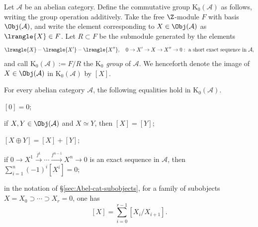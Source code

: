 \begin{definition}\label{def:K0}
Let $\mathcal{A}$ be an abelian category. Define the commutative group
$\mathrm{K}_0(\mathcal{A})$ as follows, writing the group operation
additively. Take the free $\Z$-module $F$ with basis $\Obj(\mathcal{A})$, and
write the element corresponding to $X\in\Obj(\mathcal{A})$ as
$\lrangle{X}\in F$. Let $R\subset F$ be the submodule generated by the
elements
\[\lrangle{X}-\lrangle{X'}-\lrangle{X''},\quad
0\to X'\to X\to X''\to0:\ \text{a short exact sequence in }\mathcal{A},\]
and call $\mathrm{K}_0(\mathcal{A}):=F/R$ the \emph{$\mathrm{K}_0$ group} of
$\mathcal{A}$. We henceforth denote the image of
$X\in\Obj(\mathcal{A})$ in $\mathrm{K}_0(\mathcal{A})$ by $[X]$.
\end{definition}

\begin{lemma}\label{prop:K0-prep}
For every abelian category $\mathcal{A}$, the following equalities hold in
$\mathrm{K}_0(\mathcal{A})$.
\begin{compactenum}[(i)]
	\item $[0]=0$;
	\item if $X,Y\in\Obj(\mathcal{A})$ and $X\simeq Y$, then $[X]=[Y]$;
	\item $[X\oplus Y]=[X]+[Y]$;
	\item if
	$0\to X^1\xrightarrow{f^1}\cdots\xrightarrow{f^{n-1}}X^n\to0$
	is an exact sequence in $\mathcal{A}$, then
	$\sum_{i=1}^{n}(-1)^i[X^i]=0$;
	\item in the notation of \S\ref{sec:Abel-cat-subobjects}, for a family of
	subobjects $X=X_0\supset\cdots\supset X_r=0$, one has
	\[[X]=\sum_{i=0}^{r-1}[X_i/X_{i+1}].\]
\end{compactenum}
\end{lemma}


